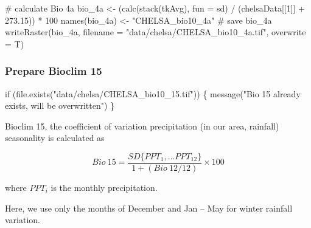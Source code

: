 \documentclass[
]{article}
\newenvironment{Shaded}{}{}
\newcommand{\CommentTok}[1]{\textcolor[rgb]{0.00,0.50,0.00}{#1}}
\newcommand{\ControlFlowTok}[1]{\textcolor[rgb]{0.00,0.00,1.00}{#1}}
\newcommand{\DataTypeTok}[1]{#1}
\newcommand{\DecValTok}[1]{#1}
\newcommand{\FloatTok}[1]{#1}
\newcommand{\KeywordTok}[1]{\textcolor[rgb]{0.00,0.00,1.00}{#1}}
\newcommand{\NormalTok}[1]{#1}
\newcommand{\OperatorTok}[1]{#1}
\newcommand{\StringTok}[1]{\textcolor[rgb]{0.00,0.50,0.50}{#1}}
\begin{document}
\begin{Shaded}
\begin{Highlighting}[]
\CommentTok{# calculate Bio 4a}
\NormalTok{bio_4a <-}\StringTok{ }\NormalTok{(}\KeywordTok{calc}\NormalTok{(}\KeywordTok{stack}\NormalTok{(tkAvg), }\DataTypeTok{fun =}\NormalTok{ sd) }\OperatorTok{/}\StringTok{ }\NormalTok{(chelsaData[[}\DecValTok{1}\NormalTok{]] }\OperatorTok{+}\StringTok{ }\FloatTok{273.15}\NormalTok{)) }\OperatorTok{*}\StringTok{ }\DecValTok{100}
\KeywordTok{names}\NormalTok{(bio_4a) <-}\StringTok{ "CHELSA_bio10_4a"}
\CommentTok{# save bio_4a}
\KeywordTok{writeRaster}\NormalTok{(bio_4a, }\DataTypeTok{filename =} \StringTok{"data/chelsa/CHELSA_bio10_4a.tif"}\NormalTok{, }\DataTypeTok{overwrite =}\NormalTok{ T)}
\end{Highlighting}
\end{Shaded}

\hypertarget{prepare-bioclim-15}{%
\subsubsection{Prepare Bioclim 15}\label{prepare-bioclim-15}}

\begin{Shaded}
\begin{Highlighting}[]
\ControlFlowTok{if}\NormalTok{ (}\KeywordTok{file.exists}\NormalTok{(}\StringTok{"data/chelsa/CHELSA_bio10_15.tif"}\NormalTok{)) \{}
  \KeywordTok{message}\NormalTok{(}\StringTok{"Bio 15 already exists, will be overwritten"}\NormalTok{)}
\NormalTok{\}}
\end{Highlighting}
\end{Shaded}

Bioclim 15, the coefficient of variation precipitation (in our area, rainfall) seasonality is calculated as

\[Bio\ 15 = \frac{SD\{ PPT_1, \ldots PPT_{12} \}}{1 + (Bio\ 12 / 12)} \times 100\]

where \(PPT_i\) is the monthly precipitation.

Here, we use only the months of December and Jan -- May for winter rainfall variation.
\end{document}
